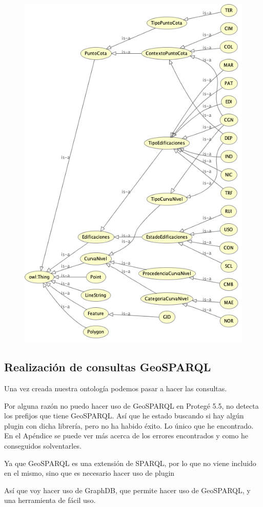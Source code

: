 \begin{figure}[H]
	\centering
	\includegraphics[width=0.7\linewidth]{imagenes/capitulo4/ontologia-final}
	\caption{}
	\label{fig:ontologia-final}
\end{figure}

\subsection{Realización de consultas GeoSPARQL}


Una vez  creada nuestra ontología podemos pasar a hacer las consultas.

Por alguna razón no puedo hacer uso de GeoSPARQL en Protegé 5.5, no detecta los prefijos que tiene GeoSPARQL. Así que he estado buscando si hay algún plugin con dicha librería, pero no ha habido éxito. Lo único que he encontrado. En el Apéndice se puede ver más acerca de los errores encontrados y como he conseguidos solventarles.

Ya que GeoSPARQL es una extensión de SPARQL, por lo que no viene incluido en el mismo, sino que es necesario hacer uso de plugin

Así que voy hacer uso de GraphDB, que permite hacer uso de GeoSPARQL, y una herramienta de fácil uso.





